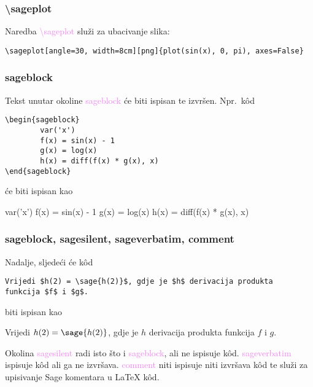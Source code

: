 \documentclass{beamer}
\begin{document}
\begin{frame}[fragile]\frametitle{\textbackslash sageplot}
Naredba \textcolor{violet}{\textbackslash sageplot} služi za ubacivanje slika:
\begin{lstlisting}
\sageplot[angle=30, width=8cm][png]{plot(sin(x), 0, pi), axes=False}
\end{lstlisting}
\begin{center}
\end{center}
\end{frame}

\begin{frame}[fragile]\frametitle{sageblock}
Tekst unutar okoline \textcolor{violet}{sageblock} će biti ispisan te izvršen. Npr.\ k\^od
\begin{lstlisting}
\begin{sageblock}
        var('x')
        f(x) = sin(x) - 1
        g(x) = log(x)
        h(x) = diff(f(x) * g(x), x)
\end{sageblock}
\end{lstlisting}
će biti ispisan kao
\begin{sageblock}
        var('x')
        f(x) = sin(x) - 1
        g(x) = log(x)
        h(x) = diff(f(x) * g(x), x)
\end{sageblock}
\end{frame}

\begin{frame}[fragile]\frametitle{sageblock, sagesilent, sageverbatim, comment}
Nadalje, sljedeći će k\^od
\begin{lstlisting}
Vrijedi $h(2) = \sage{h(2)}$, gdje je $h$ derivacija produkta
funkcija $f$ i $g$.
\end{lstlisting}
biti ispisan kao
\begin{block}{}
Vrijedi $h(2) = \sage{h(2)}$, gdje je $h$ derivacija produkta funkcija $f$ i $g$.
\end{block}
Okolina \textcolor{violet}{sagesilent} radi isto što i \textcolor{violet}{sageblock}, ali ne ispisuje k\^od. \textcolor{violet}{sageverbatim} ispisuje k\^od ali ga ne izvršava. \textcolor{violet}{comment} niti ispisuje niti izvršava k\^od te služi za upisivanje Sage komentara u \LaTeX{} k\^od.
\end{frame}
\end{document}
